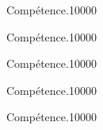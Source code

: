 
\begin{pageAuto} %

\begin{ExoAutoN}{Compétence.}{1}{0}{0}{0}{0}

\end{ExoAutoN}

\begin{ExoAutoN}{Compétence.}{1}{0}{0}{0}{0}

\end{ExoAutoN}


\begin{ExoAutoN}{Compétence.}{1}{0}{0}{0}{0}

\end{ExoAutoN}

\end{pageAuto} %


\begin{pageAlgo} %

\begin{ExoAlgoN}{Compétence.}{1}{0}{0}{0}{0}

\end{ExoAlgoN}

\begin{ExoAlgo}{Compétence.}{1}{0}{0}{0}{0}

\end{ExoAlgo}

\end{pageAlgo} %


\begin{pageBrouillon}

\end{pageBrouillon}


